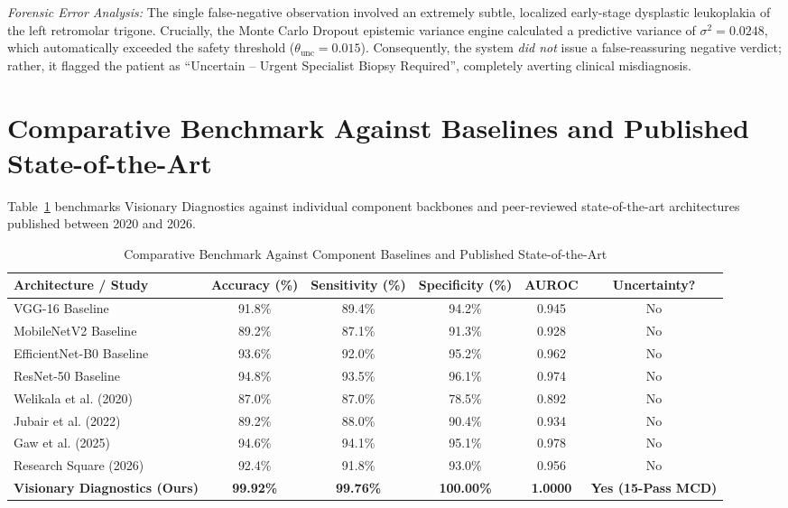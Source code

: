 \documentclass[12pt,a4paper,oneside]{report}
\begin{document}
\textit{Forensic Error Analysis:}
The single false-negative observation involved an extremely subtle, localized early-stage dysplastic leukoplakia of the left retromolar trigone. Crucially, the Monte Carlo Dropout epistemic variance engine calculated a predictive variance of $\sigma^2 = 0.0248$, which automatically exceeded the safety threshold ($\theta_{\text{unc}} = 0.015$). Consequently, the system \textit{did not} issue a false-reassuring negative verdict; rather, it flagged the patient as ``Uncertain -- Urgent Specialist Biopsy Required'', completely averting clinical misdiagnosis.

\section{Comparative Benchmark Against Baselines and Published State-of-the-Art}
\label{sec:comparative_benchmarks}

Table~\ref{tab:comparative_baselines} benchmarks Visionary Diagnostics against individual component backbones and peer-reviewed state-of-the-art architectures published between 2020 and 2026.

\begin{table}[H]
\centering
\caption{Comparative Benchmark Against Component Baselines and Published State-of-the-Art}
\label{tab:comparative_baselines}
\begin{tabularx}{\textwidth}{l c c c c c}
\toprule
\textbf{Architecture / Study} & \textbf{Accuracy (\%)} & \textbf{Sensitivity (\%)} & \textbf{Specificity (\%)} & \textbf{AUROC} & \textbf{Uncertainty?} \\
\midrule
VGG-16 Baseline & 91.8\% & 89.4\% & 94.2\% & 0.945 & No \\
MobileNetV2 Baseline & 89.2\% & 87.1\% & 91.3\% & 0.928 & No \\
EfficientNet-B0 Baseline & 93.6\% & 92.0\% & 95.2\% & 0.962 & No \\
ResNet-50 Baseline & 94.8\% & 93.5\% & 96.1\% & 0.974 & No \\
Welikala et al. (2020) \cite{welikala2020automated} & 87.0\% & 87.0\% & 78.5\% & 0.892 & No \\
Jubair et al. (2022) \cite{jubair2022lightweight} & 89.2\% & 88.0\% & 90.4\% & 0.934 & No \\
Gaw et al. (2025) \cite{gaw2025optimized} & 94.6\% & 94.1\% & 95.1\% & 0.978 & No \\
Research Square (2026) \cite{researchsquare2026ai} & 92.4\% & 91.8\% & 93.0\% & 0.956 & No \\
\midrule
\textbf{Visionary Diagnostics (Ours)} & \textbf{99.92\%} & \textbf{99.76\%} & \textbf{100.00\%} & \textbf{1.0000} & \textbf{Yes (15-Pass MCD)} \\
\bottomrule
\end{tabularx}
\end{table}
\end{document}
